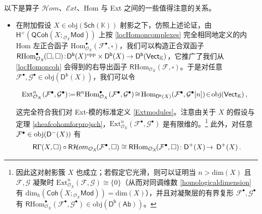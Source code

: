 \begin{Rem}\label{HomExtRem}
以下是算子 $\mathcal{H}om$、$\mathcal{E}xt$、Hom 与 Ext 之间的一些值得注意的关系。
\begin{itemize}[leftmargin=0.5cm]
	\item 在附加假设 $X\in\text{obj}(\mathsf{Sch}(\mathbb{K}))$ 射影之下，仿照上述论证，由 $\mathsf{H^+}(\mathsf{QCoh}(X;{}_{\mathcal{O}_X}\!\mathsf{Mod}))$ 上按 \eqref{locHomoncomplexes} 完全相同地定义的内 Hom 左正合函子 $\text{Hom}_{\mathcal{O}_X}^\bullet(\mathcal{F}^\bullet,\square)$，我们可以构造正合双函子 $\mathsf{R}\text{Hom}_{\mathcal{O}_X}^\bullet\!(\square,\square)\!:\!\mathsf{D^b}(X)^\textup{opp}\times\mathsf{D^b}(X)\rightarrow\mathsf{D^b}(\mathsf{Vect}_\mathbb{K})$，它推广了我们从 \eqref{locHomoncoh} 会得到的右导出函子 $\mathsf{R}\text{Hom}_{\mathcal{O}_X}\!(\mathcal{F},\square)$。于是对任意 $\mathcal{F}^\bullet,\mathcal{G}^\bullet\in\text{obj}(\mathsf{D^b}(X))$，我们可以令 
	\begin{small}\begin{equation}\label{ExtRHomforcomplexes}
			\mkern-12mu\text{Ext}_{\mathcal{O}_X}^n(\mathcal{F}^\bullet,\mathcal{G}^\bullet)\!\coloneqq\!\mathsf{R}^n\text{Hom}_{\mathcal{O}_X}^\bullet(\mathcal{F}^\bullet,\mathcal{G}^\bullet)\!\cong\!\text{Hom}_{\mathsf{D^b}(X)}(\mathcal{F}^\bullet,\mathcal{G}^\bullet[n])\!\in\!\text{obj}(\mathsf{Vect}_\mathbb{K})\,,
	\end{equation}\end{small}
	\!\!这完全符合我们对 Ext-模的标准定义 \eqref{Extmodules}。注意由关于 $X$ 的假设与定理 \ref{sheafcohomforprojsch}，$\text{Ext}_{\mathcal{O}_X}^n\!(\mathcal{F}^\bullet,\mathcal{G}^\bullet)$ 是有限维的。\footnote{因此这对射影簇 $X$ 也成立；若假定它光滑，则可以证明当 $n>\text{dim}(X)$ 且 $\mathcal{F},\mathcal{G}$ 凝聚时 $\text{Ext}_{\mathcal{O}_X}^n\!(\mathcal{F},\mathcal{G})\cong\{0\}$（从而对同调维数 \eqref{homologicaldimension} 有 $\text{dim}_h(\mathsf{Coh}(X;{}_{\mathcal{O}_X}\!\mathsf{Mod}))=\text{dim}(X)$），并且对凝聚层的有界复形 $\mathcal{F}^\bullet,\mathcal{G}^\bullet$ 有 $\mathsf{R}\text{Hom}_{\mathcal{O}_X}^\bullet(\mathcal{F}^\bullet,\mathcal{G}^\bullet)\in\text{obj}(\mathsf{D^b(Ab)})$。} 此外，对任意 $\mathcal{F}^\bullet\in\textup{obj}(\mathsf{D^-}(X))$ 有
	\begin{equation}\label{locHomcompo}
		\mathsf{R}\Gamma(X,\square)\circ\mathsf{R}\mathcal{H}om_{\mathcal{O}_X}\!(\mathcal{F}^\bullet,\square)\cong\mathsf{R}\textup{Hom}_{\mathcal{O}_X}\!(\mathcal{F}^\bullet,\square)\!:\mathsf{D^+}(X)\!\rightarrow~{\!\mathsf{D^+}(X)}\,.
	\end{equation} 
	

\end{itemize}
\end{Rem}
